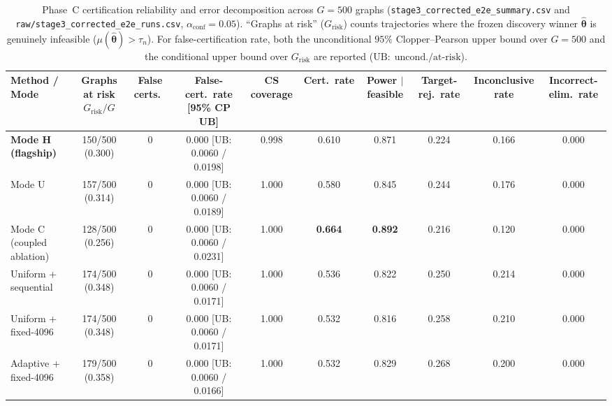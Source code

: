 \begin{table}[htbp]
\caption{Phase~C certification reliability and error decomposition across $G=500$ graphs (\texttt{stage3\_corrected\_e2e\_summary.csv} and \texttt{raw/stage3\_corrected\_e2e\_runs.csv}, $\alpha_{\mathrm{conf}}=0.05$). ``Graphs at risk'' ($G_{\mathrm{risk}}$) counts trajectories where the frozen discovery winner $\hat{\bm{\theta}}$ is genuinely infeasible ($\mu(\hat{\bm{\theta}}) > \tau_n$). For false-certification rate, both the unconditional $95\%$ Clopper--Pearson upper bound over $G=500$ and the conditional upper bound over $G_{\mathrm{risk}}$ are reported ($\mathrm{UB}:\; \mathrm{uncond.} / \mathrm{at\text{-}risk}$).}
\label{tab:phaseC_reliability}
\centering
\scriptsize
\begin{tabular}{@{}l c c c c c c c c c@{}}
\toprule
Method / Mode & Graphs at risk $G_{\mathrm{risk}}/G$ & False certs.\ & False-cert.\ rate [95\% CP UB] & CS coverage & Cert.\ rate & Power $\mid$ feasible & Target-rej.\ rate & Inconclusive rate & Incorrect-elim.\ rate \\
\midrule
\textbf{Mode H (flagship)} & 150/500 (0.300) & 0 & 0.000 [UB: 0.0060 / 0.0198] & 0.998 & 0.610 & 0.871 & 0.224 & 0.166 & 0.000 \\
Mode U & 157/500 (0.314) & 0 & 0.000 [UB: 0.0060 / 0.0189] & 1.000 & 0.580 & 0.845 & 0.244 & 0.176 & 0.000 \\
Mode C (coupled ablation) & 128/500 (0.256) & 0 & 0.000 [UB: 0.0060 / 0.0231] & 1.000 & \textbf{0.664} & \textbf{0.892} & 0.216 & 0.120 & 0.000 \\
Uniform + sequential & 174/500 (0.348) & 0 & 0.000 [UB: 0.0060 / 0.0171] & 1.000 & 0.536 & 0.822 & 0.250 & 0.214 & 0.000 \\
Uniform + fixed-4096 & 174/500 (0.348) & 0 & 0.000 [UB: 0.0060 / 0.0171] & 1.000 & 0.532 & 0.816 & 0.258 & 0.210 & 0.000 \\
Adaptive + fixed-4096 & 179/500 (0.358) & 0 & 0.000 [UB: 0.0060 / 0.0166] & 1.000 & 0.532 & 0.829 & 0.268 & 0.200 & 0.000 \\
\bottomrule
\end{tabular}
\end{table}
